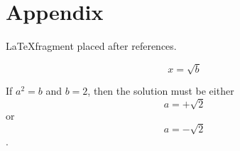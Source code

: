 \section*{Appendix}

\LaTeX fragment placed after references.

\begin{equation}
     x=\sqrt{b}
\end{equation}
     
     If $a^2=b$ and \( b=2 \), then the solution must be
     either $$ a=+\sqrt{2} $$ or \[ a=-\sqrt{2} \].
     

